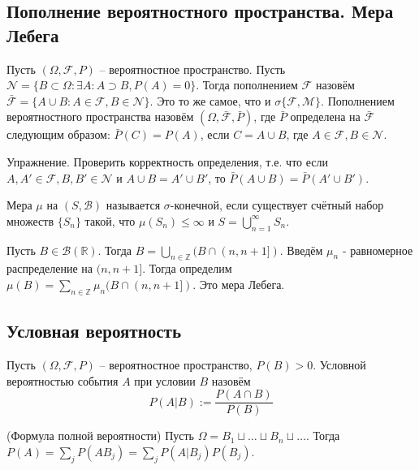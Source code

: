 	\subsection{Пополнение вероятностного пространства. Мера Лебега}
	
	\begin{definition}\label{lect03:def3}
	Пусть $(\Omega,\mathcal{F},P)$ -- вероятностное пространство. Пусть $\mathcal{N} = \{B\subset\Omega: \exists A: A\supset B, P(A)=0\}$. Тогда пополнением $\mathcal{F}$ назовём $\mathcal{\bar F} = \{ A \cup B: A \in \mathcal{F} , B \in \mathcal{N} \}$. Это то же самое, что и $\sigma\{\mathcal{F},\mathcal{M}\}$. Пополнением вероятностного пространства назовём $(\Omega,\mathcal{\bar F},\bar P)$, где $\bar P$ определена на $\mathcal{\bar F}$ следующим образом: $\bar P(C) = P(A)$, если $C=A\cup B$, где $A\in\mathcal{F},B\in\mathcal{N}$.
	\end{definition}
	
    Упражнение. Проверить корректность определения, т.е. что если \\$A,A'\in\mathcal{F}, B,B'\in\mathcal{N}$ и $A\cup B = A' \cup B'$, то $\bar P(A\cup B) = \bar P(A' \cup B')$.
    
    \begin{definition}\label{lect03:def4}
        Мера $\mu$ на $(S,\mathcal{B})$ называется $\sigma$-конечной, если существует счётный набор множеств $\{ S_n\}$ такой, что $\mu (S_n)\le \infty$ и $S=\bigcup\limits_{n=1}^{\infty} S_n$.
    \end{definition}
    
    \begin{definition}\label{lect03:def5}
    Пусть $B\in\mathcal{B}(\mathbb{R})$. Тогда $B = \bigcup\limits_{n\in\mathbb{Z}} (B\cap (n,n+1])$. Введём $\mu_n$ - равномерное распределение на $(n,n+1]$. Тогда определим $\mu(B) = \sum\limits_{n\in\mathbb{Z}} \mu_n(B\cap (n,n+1])$. Это мера Лебега.
    \end{definition}
    
    \subsection{Условная вероятность}
    
    \begin{definition}\label{lect03:def6}
        Пусть $(\Omega,\mathcal{F},P)$ -- вероятностное пространство, ${P(B)>0}$. Условной вероятностью события $A$ при условии $B$ назовём 
        $$
        P(A|B) := \frac{P(A\cap B)}{P(B)}
        $$
    \end{definition}
    
    \begin{theorem}(Формула полной вероятности)\label{lect03:th3}
        Пусть $\Omega = B_1 \sqcup \ldots \sqcup B_n \sqcup \ldots $. Тогда $P(A) = \sum_{j} P(AB_j) = \sum_{j} P(A|B_j)P(B_j)$.
    \end{theorem}